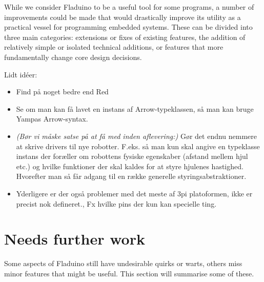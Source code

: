 \documentclass[a4paper, oneside, final]{memoir}
\begin{document}
While we consider Fladuino to be a useful tool for some programs, a
number of improvements could be made that would drastically improve
its utility as a practical vessel for programming embedded systems.
These can be divided into three main categories: extensions or fixes
of existing features, the addition of relatively simple or isolated
technical additions, or features that more fundamentally change core
design decisions.

Lidt idéer:
\begin{itemize}
\item Find på noget bedre end Red 
\item Se om man kan få lavet en instans af Arrow-typeklassen, så man
  kan bruge Yampas Arrow-syntax.
\item \textit{(Bør vi måske satse på at få med inden aflevering:)}
  Gør det endnu nemmere at skrive drivers til nye
  robotter. F.eks. så man kun skal angive en typeklasse instans der
  foræller om robottens fysiske egenskaber (afstand mellem hjul etc.)
  og hvilke funktioner der skal kaldes for at styre hjulenes
  hastighed. Hvorefter man så får adgang til en række generelle
  styringsabstraktioner.

\item  Yderligere er der også problemer med det meste af 3pi platoformen, ikke
  er precist nok defineret., Fx hvilke pins der kun kan specielle ting.
\end{itemize}

\section{Needs further work}

Some aspects of Fladuino still have undesirable quirks or warts,
others miss minor features that might be useful.  This section will
summarise some of these.
\end{document}
